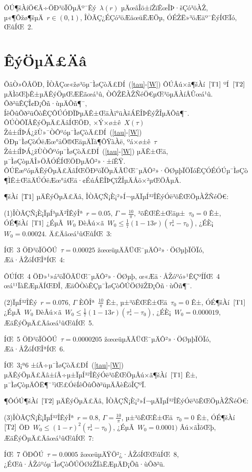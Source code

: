 \documentclass[12pt,openany,CJK,oneside]{cctbook}
\begin{document}
{ÔÚ¶šÀíÖ€Ã÷ÖÐ³öÏÖµÄº¯Êý\ $\lambda(r)$ µÄœâÎö±íŽïÊœÎÞ·šÇó³öÀŽ, µ«¶Ôžø¶šµÄ\ $r\in(0,1)$, ÎÒÃÇ¿ÉÇó³öÆäœüËÆÖµ, ÓÉŽË»­³öÆäº¯ÊýÍŒÏó, ŒûÍŒ\ 2.



\chapter{\heiti ÊýÖµÄ£Äâ}

ÕâÒ»ÕÂÖÐ, ÎÒÃÇœ«žø³öµ¯ÌøÇòÄ£ÐÍ\ (\ref{tau}-\ref{W}) ÔÚÂú×ã¶šÀí\ $\ref{T1}$ ºÍ\ $\ref{T2}$ µÄÌõŒþÊ±µÄÊýÖµŒÆËãœá¹û, ÒÔŽËÀŽÑéÖ€µŒ³öµÄÀíÂÛœá¹û. Õð²üÊÇÎ¢Ð¡Õñ·ùµÄÕñ¶¯, ÍêÕûÕð²üÔòÊÇÔÚÓÐÏÞµÄÊ±ŒäÀï°üÀšÁËÎÞÊýŽÎµÄÕñ¶¯. ÔÚÒÔÏÂÊýÖµÄ£ÄâÍŒÖÐ, ×Ý×ø±ê\ $X(\tau)$ Žú±íÎÞÁ¿žÙ»¯ÒÔºóµ¯ÌøÇòÄ£ÐÍ\ (\ref{tau}-\ref{W}) ÖÐµ¯ÌøÇòÓëÆœ°åÖ®ŒäµÄÏà¶ÔŸàÀë, ºá×ø±ê\ $\tau$ Žú±íÎÞÁ¿žÙÒÔºóµ¯ÌøÇòÄ£ÐÍ\ (\ref{tau}-\ref{W}) µÄÊ±Œä, µ¯ÌøÇòµÄÎ»ÖÃÓÉÍŒÖÐµÄÔ²»·±íÊŸ. ÔÚËæºóµÄÊýÖµÄ£ÄâÍŒÖÐ³öÏÖµÄÃÜŒ¯µÄÔ²»·ÖØµþÏÖÏóÊÇÓÉÓÚµ¯ÌøÇò¶ÌÊ±ŒäÄÚÓëÆœ°åŒä·¢ÉúÁËÎÞÇîŽÎµÄÅö×²µŒÖÂµÄ.

¶šÀí\ $\ref{T1}$ µÄÊýÖµÄ£Äâ, ÎÒÃÇÑ¡È¡²»Í¬µÄÏµÍ³²ÎÊýÓë³õÊŒÖµÀŽÑéÖ€:

(1)ÎÒÃÇÑ¡È¡ÏµÍ³µÄ²ÎÊýÎª\ $r=0.05$, $\Gamma=\frac{10}{\pi}$,
³õÊŒÊ±Œäµ±\ $\tau_0=0$ Ê±, ÓÉ¶šÀí\ $\ref{T1}$ ¿ÉµÃ\ $W_0$ ÐèÂú×ã\ $W_0\leq \frac{1}{7}(1-13r)(\tau^1_*-\tau_0)$, ¿ÉÈ¡\ $W_0=0.00024$. Ä£Äâœá¹ûŒûÍŒ\ 3:


ÍŒ\ 3 ÖÐ³öÏÖÔÚ\ $\tau=0.00025$ žœœüµÄÃÜŒ¯µÄÔ²»·ÖØµþÏÖÏó, Æä·ÅŽóÍŒÎªÍŒ\ 4:

ÔÚÍŒ\ 4 ÖÐ»¹»á³öÏÖÃÜŒ¯µÄÔ²»·ÖØµþ, œ«Æä·ÅŽóºó»¹ÊÇºÍÍŒ\ 4 œá¹¹ÏàËÆµÄÍŒÐÎ, ÆäÔ­ÒòÊÇµ¯ÌøÇòÔÚÖØžŽÐ¡Õñ·ùÕñ¶¯.

(2)ÏµÍ³²ÎÊý\ $r=0.076$, $\Gamma$ ÈÔÎª\ $\frac{10}{\pi}$ Ê±, µ±³õÊŒÊ±Œä\ $\tau_0=0$ Ê±, ÓÉ¶šÀí\ $\ref{T1}$ ¿ÉµÃ\ $W_0$ ÐèÂú×ã\ $W_0\leq \frac{1}{7}(1-13r)(\tau^1_*-\tau_0)$, ¿ÉÈ¡\ $W_0=0.000019$, ÆäÊýÖµÄ£Äâœá¹ûŒûÍŒ\ 5.

ÍŒ\ 5 ÖÐ³öÏÖÔÚ\ $\tau=0.0000205$ žœœüµÄÃÜŒ¯µÄÔ²»·ÖØµþÏÖÏó, Æä·ÅŽóÍŒÎªÍŒ\ 6.

ÍŒ\ 3¡ª6 ±íÃ÷µ¯ÌøÇòÄ£ÐÍ\ (\ref{tau}-\ref{W}) µÄÊýÖµÄ£Äâ±íÃ÷µ±ÏµÍ³²ÎÊýÓë³õÊŒÖµÂú×ã¶šÀí\ $\ref{T1}$ Ê±, µ¯ÌøÇòµÄÔË¶¯¹ìŒ£ÓëÍêÕûÕð²üµÄÃèÊöÎÇºÏ.

¶ÔÓÚ¶šÀí\ $\ref{T2}$ µÄÊýÖµÄ£Äâ, ÎÒÃÇÑ¡È¡²»Í¬µÄÏµÍ³²ÎÊýÓë³õÊŒÖµÀŽÑéÖ€:

(3)ÎÒÃÇÑ¡È¡ÏµÍ³²ÎÊýÎª\ $r=0.8$, $\Gamma=\frac{10}{\pi}$, µ±³õÊŒÊ±Œä\ $\tau_0=0$ Ê±, ÓÉ¶šÀí\ $\ref{T2}$ ÖÐ\ $W_0\leq (1-r)^2(\tau^1_*-\tau_0)$, ¿ÉµÃ\ $W_0=0.0001)$ Âú×ãÌõŒþ, ÆäÊýÖµÄ£Äâœá¹ûŒûÍŒ\ 7:

ÍŒ\ 7 ÖÐÔÚ\ $\tau=0.0005$ žœœüµÄŸÖ²¿·ÅŽóÍŒŒûÍŒ\ 8, ¿ÉŒû·ÅŽóºóµ¯ÌøÇòÔÚÖØžŽÏàËÆµÄÐ¡Õñ·ùÕð²ü.

}
\end{document}
